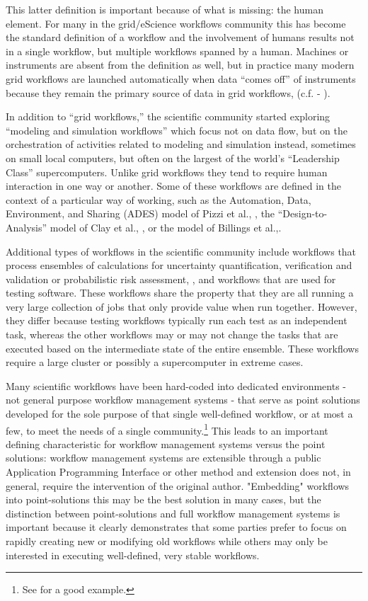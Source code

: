 This latter definition is important because of what is missing: the human
element. For many in the grid/eScience workflows community this has become
the standard definition of a workflow and the involvement of humans
results not in a single workflow, but multiple workflows spanned by a human.
Machines or instruments are absent from the definition as well, but in
practice many modern grid workflows are launched automatically
when data ``comes off'' of instruments because they remain the primary
source of data in grid workflows, (c.f. - \cite{megino_panda:_2015}).

In addition to ``grid workflows,'' the scientific community started
exploring ``modeling and simulation workflows'' which focus not on data
flow, but on the orchestration of activities related to modeling and
simulation instead, sometimes on small local computers, but often on the
largest of the world's ``Leadership Class'' supercomputers. Unlike grid
workflows they tend to require human interaction in one way or another.
Some of these workflows are defined in the context of a particular way
of working, such as the Automation, Data, Environment, and Sharing
(ADES) model of Pizzi et al., \cite{pizzi_aiida:_2016}, the
``Design-to-Analysis'' model of Clay et al., \cite{clay_incorporating_2015}, or
the model of Billings et al.,\cite{billings_eclipse_2017}.

Additional types of workflows in the scientific community include
workflows that process ensembles of calculations for uncertainty quantification, verification and validation or probabilistic risk assessment, \cite{montoya_apex_2016},
and workflows that are used for testing software. These workflows share the property that they are all running a very large collection of jobs that only provide value when run together. However, they differ because testing workflows typically run each test as an independent task, whereas the other workflows may or may not change the tasks that are executed based on the intermediate state of the entire ensemble. These workflows require a large cluster or possibly a supercomputer in extreme cases.

Many scientific workflows have been hard-coded into dedicated environments - not general purpose workflow management systems - that serve as point solutions developed for the sole purpose of that single well-defined workflow, or at most a few, to meet the needs of a single community.\footnote{See \cite{lingerfelt_beam:_2016} for a good example.} This leads to an important defining characteristic for workflow management systems versus the point solutions: workflow management systems are extensible through a public Application Programming Interface or other method and extension does not, in general, require the intervention of the original author. "Embedding" workflows into point-solutions this may be the best solution in many cases, but the distinction between point-solutions and full workflow management systems is important because it clearly demonstrates  that some parties prefer to focus on rapidly creating new or modifying old workflows while others may only be interested in executing well-defined, very stable workflows.

